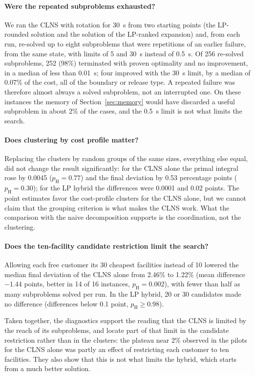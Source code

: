 \paragraph{Were the repeated subproblems exhausted?} We ran the CLNS with rotation for 30~s from
two starting points (the LP-rounded solution and the solution of the LP-ranked expansion) and,
from each run, re-solved up to eight subproblems that were repetitions of an earlier failure, from
the same state, with limits of 5 and 30~s instead of 0.5~s. Of 256 re-solved subproblems, 252
(98\%) terminated with proven optimality and no improvement, in a median of less than 0.01~s; four
improved with the 30~s limit, by a median of 0.07\% of the cost, all of the boundary or release
type. A repeated failure was therefore almost always a solved subproblem, not an interrupted one.
On these instances the memory of Section~\ref{sec:memory} would have discarded a useful subproblem
in about 2\% of the cases, and the 0.5~s limit is not what limits the search.

\paragraph{Does clustering by cost profile matter?} Replacing the clusters by random groups of the
same sizes, everything else equal, did not change the result significantly: for the CLNS alone
the primal integral rose by 0.0045 ($p_{\mathrm{H}}=0.77$) and the final deviation by 0.53
percentage points ($p_{\mathrm{H}}=0.30$); for the LP hybrid the differences were 0.0001 and 0.02
points. The point estimates favor the cost-profile clusters for the CLNS alone, but we cannot
claim that the grouping criterion is what makes the CLNS work. What the comparison with the naive
decomposition supports is the coordination, not the clustering.

\paragraph{Does the ten-facility candidate restriction limit the search?} Allowing each free
customer its 30 cheapest facilities instead of 10 lowered the median final deviation of the CLNS
alone from 2.46\% to 1.22\% (mean difference $-1.44$ points, better in 14 of 16 instances,
$p_{\mathrm{H}}=0.002$), with fewer than half as many subproblems solved per run. In the LP hybrid, 20 or
30 candidates made no difference (differences below 0.1 point, $p_{\mathrm{H}}\ge0.98$).

Taken together, the diagnostics support the reading that the CLNS is limited by the reach of its
subproblems, and locate part of that limit in the candidate restriction rather than in the
clusters: the plateau near 2\% observed in the pilots for the CLNS alone was partly an effect of
restricting each customer to ten facilities. They also show that this is not what limits the
hybrid, which starts from a much better solution.


